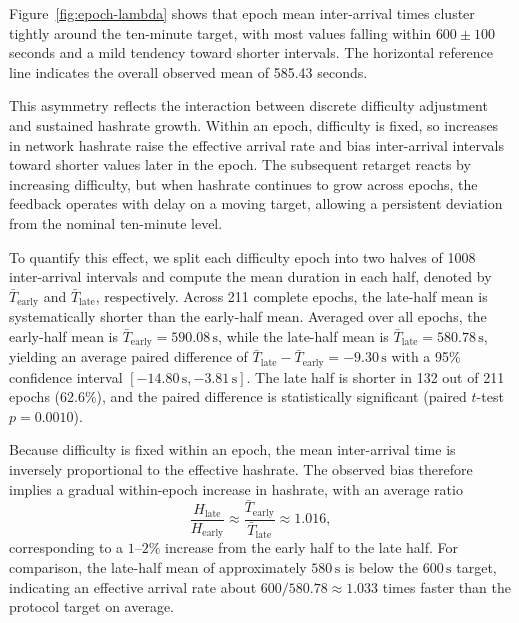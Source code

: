 \documentclass[conference]{IEEEtran}
\begin{document}
Figure~\ref{fig:epoch-lambda} shows that epoch mean inter-arrival times cluster
tightly around the ten-minute target, with most values falling within
$600 \pm 100$ seconds and a mild tendency toward shorter intervals. The
horizontal reference line indicates the overall observed mean of 585.43
seconds.


This asymmetry reflects the interaction between discrete difficulty adjustment
and sustained hashrate growth. Within an epoch, difficulty is fixed, so increases
in network hashrate raise the effective arrival rate and bias inter-arrival
intervals toward shorter values later in the epoch. The subsequent retarget
reacts by increasing difficulty, but when hashrate continues to grow across
epochs, the feedback operates with delay on a moving target, allowing a
persistent deviation from the nominal ten-minute level.

To quantify this effect, we split each difficulty epoch into two halves of 1008
inter-arrival intervals and compute the mean duration in each half, denoted by
$\bar{T}_{\mathrm{early}}$ and $\bar{T}_{\mathrm{late}}$, respectively. Across
211 complete epochs, the late-half mean is systematically shorter than the
early-half mean. Averaged over all epochs, the early-half mean is
$\bar{T}_{\mathrm{early}} = 590.08\,\mathrm{s}$, while the late-half mean is
$\bar{T}_{\mathrm{late}} = 580.78\,\mathrm{s}$, yielding an average paired
difference of
$\bar{T}_{\mathrm{late}}-\bar{T}_{\mathrm{early}} = -9.30\,\mathrm{s}$ with a
95\% confidence interval $[-14.80\,\mathrm{s}, -3.81\,\mathrm{s}]$. The late
half is shorter in 132 out of 211 epochs (62.6\%), and the paired difference is
statistically significant (paired $t$-test $p=0.0010$).

Because difficulty is fixed within an epoch, the mean inter-arrival time is
inversely proportional to the effective hashrate. The observed bias therefore
implies a gradual within-epoch increase in hashrate, with an average ratio
\begin{equation}
\frac{H_{\mathrm{late}}}{H_{\mathrm{early}}}
\approx
\frac{\bar{T}_{\mathrm{early}}}{\bar{T}_{\mathrm{late}}}
\approx 1.016,
\end{equation}
corresponding to a $1$--$2\%$ increase from the early half to the late half. For comparison, the late-half mean of approximately $580\,\mathrm{s}$ is below
the $600\,\mathrm{s}$ target, indicating an effective arrival rate about
$600/580.78 \approx 1.033$ times faster than the protocol target on average.
\end{document}

